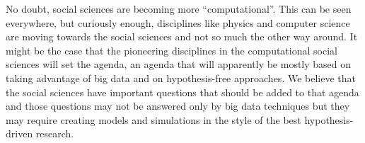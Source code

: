 \documentclass[11pt]{article}
\begin{document}
No doubt, social sciences are becoming more ``computational''. This can
be seen everywhere, but curiously enough, disciplines like physics
and computer science are moving towards the social
sciences and not so much the other way around. It might be the case
that the pioneering disciplines in the computational social sciences
will set the agenda, an agenda that will apparently be mostly based on
taking advantage of big data and on hypothesis-free approaches. We
believe that the social sciences have important questions that should
be added to that agenda and those questions may not be answered only
by big data techniques but they may require creating models and
simulations in the style of the best hypothesis-driven research.
 

%
%
%
\end{document}
